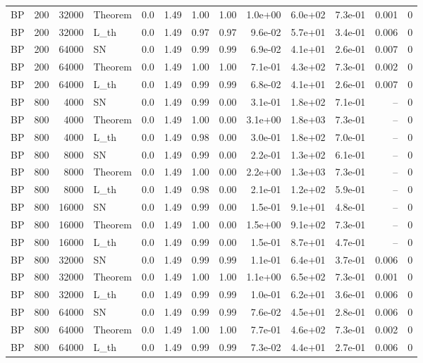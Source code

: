 \begin{tabular}{lrrlrrrrrrrrr}
BP & 200 & 32000 & Theorem & 0.0 & 1.49 & 1.00 & 1.00 & 1.0e+00 & 6.0e+02 & 7.3e-01 & 0.001 & 0 \\
BP & 200 & 32000 & L\_th & 0.0 & 1.49 & 0.97 & 0.97 & 9.6e-02 & 5.7e+01 & 3.4e-01 & 0.006 & 0 \\
BP & 200 & 64000 & SN & 0.0 & 1.49 & 0.99 & 0.99 & 6.9e-02 & 4.1e+01 & 2.6e-01 & 0.007 & 0 \\
BP & 200 & 64000 & Theorem & 0.0 & 1.49 & 1.00 & 1.00 & 7.1e-01 & 4.3e+02 & 7.3e-01 & 0.002 & 0 \\
BP & 200 & 64000 & L\_th & 0.0 & 1.49 & 0.99 & 0.99 & 6.8e-02 & 4.1e+01 & 2.6e-01 & 0.007 & 0 \\
BP & 800 & 4000 & SN & 0.0 & 1.49 & 0.99 & 0.00 & 3.1e-01 & 1.8e+02 & 7.1e-01 & -- & 0 \\
BP & 800 & 4000 & Theorem & 0.0 & 1.49 & 1.00 & 0.00 & 3.1e+00 & 1.8e+03 & 7.3e-01 & -- & 0 \\
BP & 800 & 4000 & L\_th & 0.0 & 1.49 & 0.98 & 0.00 & 3.0e-01 & 1.8e+02 & 7.0e-01 & -- & 0 \\
BP & 800 & 8000 & SN & 0.0 & 1.49 & 0.99 & 0.00 & 2.2e-01 & 1.3e+02 & 6.1e-01 & -- & 0 \\
BP & 800 & 8000 & Theorem & 0.0 & 1.49 & 1.00 & 0.00 & 2.2e+00 & 1.3e+03 & 7.3e-01 & -- & 0 \\
BP & 800 & 8000 & L\_th & 0.0 & 1.49 & 0.98 & 0.00 & 2.1e-01 & 1.2e+02 & 5.9e-01 & -- & 0 \\
BP & 800 & 16000 & SN & 0.0 & 1.49 & 0.99 & 0.00 & 1.5e-01 & 9.1e+01 & 4.8e-01 & -- & 0 \\
BP & 800 & 16000 & Theorem & 0.0 & 1.49 & 1.00 & 0.00 & 1.5e+00 & 9.1e+02 & 7.3e-01 & -- & 0 \\
BP & 800 & 16000 & L\_th & 0.0 & 1.49 & 0.99 & 0.00 & 1.5e-01 & 8.7e+01 & 4.7e-01 & -- & 0 \\
BP & 800 & 32000 & SN & 0.0 & 1.49 & 0.99 & 0.99 & 1.1e-01 & 6.4e+01 & 3.7e-01 & 0.006 & 0 \\
BP & 800 & 32000 & Theorem & 0.0 & 1.49 & 1.00 & 1.00 & 1.1e+00 & 6.5e+02 & 7.3e-01 & 0.001 & 0 \\
BP & 800 & 32000 & L\_th & 0.0 & 1.49 & 0.99 & 0.99 & 1.0e-01 & 6.2e+01 & 3.6e-01 & 0.006 & 0 \\
BP & 800 & 64000 & SN & 0.0 & 1.49 & 0.99 & 0.99 & 7.6e-02 & 4.5e+01 & 2.8e-01 & 0.006 & 0 \\
BP & 800 & 64000 & Theorem & 0.0 & 1.49 & 1.00 & 1.00 & 7.7e-01 & 4.6e+02 & 7.3e-01 & 0.002 & 0 \\
BP & 800 & 64000 & L\_th & 0.0 & 1.49 & 0.99 & 0.99 & 7.3e-02 & 4.4e+01 & 2.7e-01 & 0.006 & 0 \\

\end{tabular}
